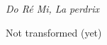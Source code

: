 \documentclass[preview]{standalone}
\begin{document}
\begin{center}
\emph{Do Ré Mi, La perdrix}

Not transformed (yet)
\end{center}
\end{document}
